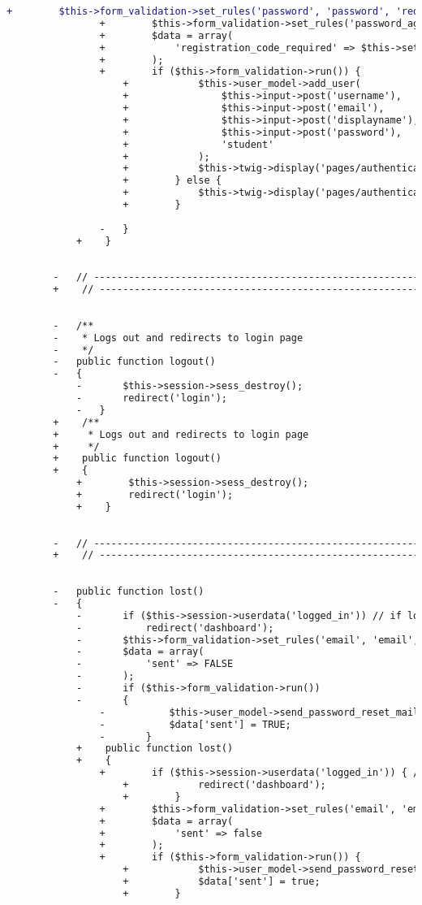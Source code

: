 \begin{lstlisting}[language=diff, caption=Perubahan pada kode Login.php]
				+        $this->form_validation->set_rules('password', 'password', 'required|min_length[6]|max_length[200]');
				+        $this->form_validation->set_rules('password_again', 'password confirmation', 'required|matches[password]');
				+        $data = array(
				+            'registration_code_required' => $this->settings_model->get_setting('registration_code') == '0' ? false : true
				+        );
				+        if ($this->form_validation->run()) {
					+            $this->user_model->add_user(
					+                $this->input->post('username'),
					+                $this->input->post('email'),
					+                $this->input->post('displayname'),
					+                $this->input->post('password'),
					+                'student'
					+            );
					+            $this->twig->display('pages/authentication/register_success.twig');
					+        } else {
					+            $this->twig->display('pages/authentication/register.twig', $data);
					+        }
				
				-	}
			+    }
		
		
		-	// ------------------------------------------------------------------------
		+    // ------------------------------------------------------------------------
		
		
		-	/**
		-	 * Logs out and redirects to login page
		-	 */
		-	public function logout()
		-	{
			-		$this->session->sess_destroy();
			-		redirect('login');
			-	}
		+    /**
		+     * Logs out and redirects to login page
		+     */
		+    public function logout()
		+    {
			+        $this->session->sess_destroy();
			+        redirect('login');
			+    }
		
		
		-	// ------------------------------------------------------------------------
		+    // ------------------------------------------------------------------------
		
		
		-	public function lost()
		-	{
			-		if ($this->session->userdata('logged_in')) // if logged in
			-			redirect('dashboard');
			-		$this->form_validation->set_rules('email', 'email', 'required|max_length[40]|lowercase|valid_email');
			-		$data = array(
			-			'sent' => FALSE
			-		);
			-		if ($this->form_validation->run())
			-		{
				-			$this->user_model->send_password_reset_mail($this->input->post('email'));
				-			$data['sent'] = TRUE;
				-		}
			+    public function lost()
			+    {
				+        if ($this->session->userdata('logged_in')) { // if logged in
					+            redirect('dashboard');
					+        }
				+        $this->form_validation->set_rules('email', 'email', 'required|max_length[40]|lowercase|valid_email');
				+        $data = array(
				+            'sent' => false
				+        );
				+        if ($this->form_validation->run()) {
					+            $this->user_model->send_password_reset_mail($this->input->post('email'));
					+            $data['sent'] = true;
					+        }
				

\end{lstlisting}
